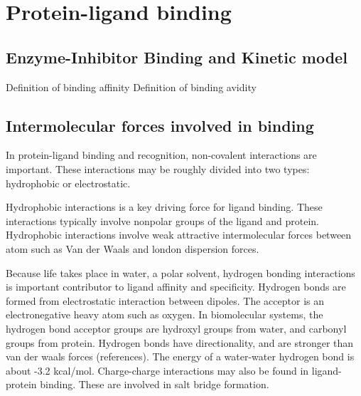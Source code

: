 \section{Protein-ligand binding}

\subsection{Enzyme-Inhibitor Binding and Kinetic model}
Definition of binding affinity
Definition of binding avidity

\subsection{Intermolecular forces involved in binding}

% 
% 
% 
% 
% 
% 


In protein-ligand binding and recognition, non-covalent interactions are important.  These interactions may be roughly divided into two types: hydrophobic or electrostatic.  

Hydrophobic interactions is a key driving force for ligand binding.  These interactions typically involve nonpolar groups of the ligand and protein. Hydrophobic interactions involve weak attractive intermolecular forces between atom such as Van der Waals and london dispersion forces. %

Because life takes place in water, a polar solvent, hydrogen bonding interactions is important contributor to ligand affinity and specificity.  Hydrogen bonds are formed from electrostatic interaction between dipoles.  The acceptor is an electronegative heavy atom such as oxygen. In biomolecular systems, the hydrogen bond acceptor groups are hydroxyl groups from water, and carbonyl groups from protein. Hydrogen bonds have directionality, and are stronger than van der waals forces (references).  The energy of a water-water hydrogen bond is about -3.2 kcal/mol. Charge-charge interactions may also be found in ligand-protein binding.  These are involved in salt bridge formation.

